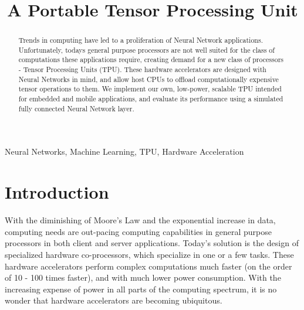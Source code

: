 \documentclass[11pt, conference, onecolumn]{IEEEtran}
\begin{document}
\title{A Portable Tensor Processing Unit\\
}

\author{
\and
{}
\and
{}
\and
{}
}

\maketitle


\begin{abstract}
    Trends in computing have led to a proliferation of Neural Network applications.
    Unfortunately, todays general purpose processors are not well suited for the class of
    computations these applications require, creating demand for a new class of processors
    - Tensor Processing Units (TPU). These hardware accelerators are designed with Neural
    Networks in mind, and allow host CPUs to offload computationally expensive
    tensor operations to them. We implement our own, low-power, scalable TPU intended for
    embedded and mobile applications, and evaluate its performance using a simulated
    fully connected Neural Network layer.
\end{abstract}

\begin{IEEEkeywords}
Neural Networks, Machine Learning, TPU, Hardware Acceleration
\end{IEEEkeywords}

\section{Introduction}
    With the diminishing of Moore's Law and the exponential increase in data, computing
    needs are out-pacing computing capabilities in general purpose processors in both
    client and server applications. Today's solution is the design of specialized hardware
    co-processors, which specialize in one or a few tasks. These hardware accelerators
    perform complex computations much faster (on the order of 10 - 100 times faster), and
    with much lower power consumption. With the increasing expense of power in all parts
    of the computing spectrum, it is no wonder that hardware accelerators are becoming
    ubiquitous.
\end{document}
